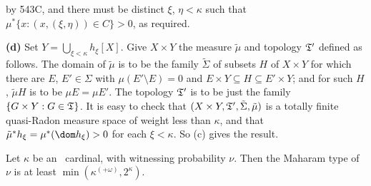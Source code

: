 {\noindent by 543C, and there must be distinct $\xi$, $\eta<\kappa$
such that $\mu^*\{x:(x,(\xi,\eta))\in C\}>0$, as required.

\medskip

{\bf (d)} Set $Y=\bigcup_{\xi<\kappa}h_{\xi}[X]$.
Give $X\times Y$ the measure $\tilde\mu$ and topology
$\frak T'$ defined as follows.   The domain of $\tilde\mu$ is to
be the family $\tilde\Sigma$ of subsets $H$ of
$X\times Y$ for which there are $E$, $E'\in\Sigma$ with
$\mu(E'\setminus E)=0$ and
$E\times Y\subseteq H\subseteq E'\times Y$;
and for such $H$, $\tilde\mu H$
is to be $\mu E=\mu E'$.   The topology $\frak{T}'$ is
to be just the family $\{G\times Y:G\in\frak{T}\}$.
It is easy to check that
$(X\times Y,\frak{T}',\tilde\Sigma,\tilde\mu)$
is a totally finite quasi-Radon measure space of weight less than
$\kappa$, and that $\tilde\mu^*h_{\xi}=\mu^*(\dom h_{\xi})>0$
for each $\xi<\kappa$.   So (c) gives the result.
}%

 Let $\kappa$ be an
\am\ cardinal, with witnessing probability $\nu$.   Then the Maharam
type of $\nu$ is at least $\min(\kappa^{(+\omega)},2^{\kappa})$.

